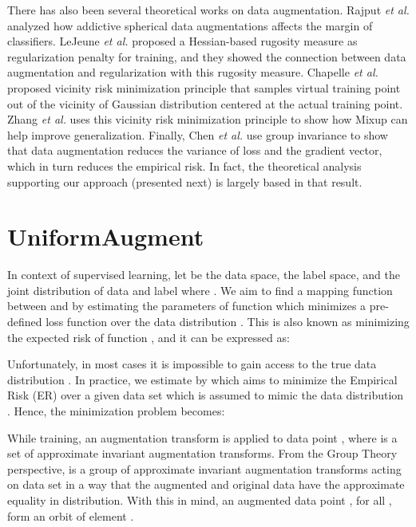 \documentclass[runningheads]{llncs}
\begin{document}
	
	


	There has also been several theoretical works on data augmentation. Rajput \emph{et al.} \cite{rajput2019does} analyzed how addictive spherical data augmentations affects the margin of classifiers. LeJeune \emph{et al.} \cite{lejeune2019implicit} proposed a Hessian-based rugosity measure as regularization penalty for training, and they showed the connection between data augmentation and regularization with this rugosity measure. Chapelle \emph{et al.} \cite{chapelle2001vicinal} proposed vicinity risk minimization principle that samples virtual training point out of the vicinity of Gaussian distribution centered at the actual training point. Zhang \emph{et al.} \cite{zhang2017mixup} uses this vicinity risk minimization principle to show how Mixup can help improve generalization. Finally, Chen \emph{et al.} \cite{chen2019invariance} use group invariance to show that data augmentation reduces the variance of loss and the gradient vector, which in turn reduces the empirical risk. In fact, the theoretical analysis supporting our approach (presented next) is largely based in that result.
	
	
	\section{UniformAugment}
	\label{sec:UA}
	


	In context of supervised learning, let  be the data space,  the label space, and  the joint distribution of data and label where . We aim to find a mapping function  between  and  by estimating the parameters of function  which minimizes a pre-defined loss function  over the data distribution . This is also known as minimizing the expected risk of function , and it can be expressed as:
	
	
	Unfortunately, in most cases it is impossible to gain access to the true data distribution . In practice, we estimate  by  which aims to minimize the Empirical Risk (ER) over a given data set  which is assumed to mimic the data distribution . Hence, the minimization problem becomes:
	
	While training, an augmentation transform  is applied to data point , where  is a set of approximate invariant augmentation transforms. From the Group Theory perspective,  is a group of approximate invariant augmentation transforms acting on data set  in a way that the augmented and original data have the approximate equality in distribution. With this in mind, an augmented data point , for all , form an orbit of element . 
\end{document}
